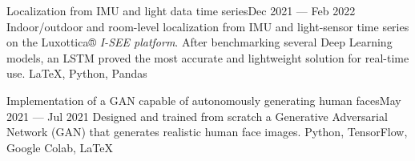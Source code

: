 

\begin{projects}
    \projectNoLink
    {Localization from IMU and light data time series}{Dec 2021 — Feb 2022}
    {Indoor/outdoor and room-level localization from IMU and light-sensor time series on the Luxottica® \textit{I-SEE platform}. After benchmarking several Deep Learning models, an LSTM proved the most accurate and lightweight solution for real-time use.}
    {\LaTeX, Python, Pandas}

    \projectNoLink
    {Implementation of a GAN capable of autonomously generating human faces}{May 2021 — Jul 2021}
    {Designed and trained from scratch a Generative Adversarial Network (GAN) that generates realistic human face images.}
    {Python, TensorFlow, Google Colab, \LaTeX}






\end{projects}
